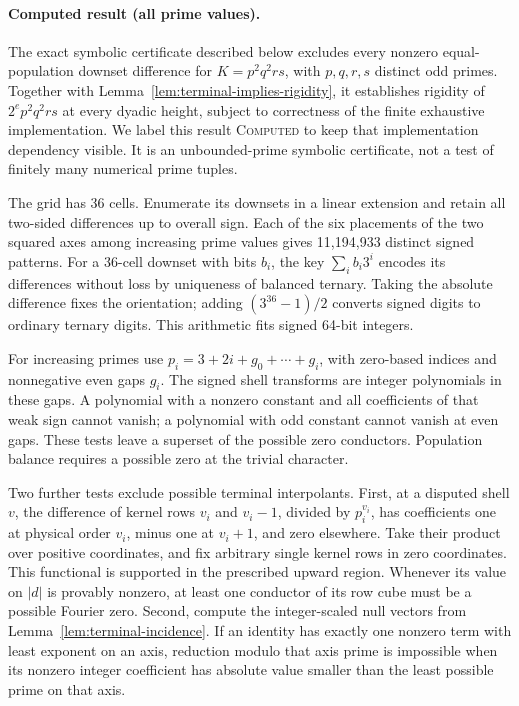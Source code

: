 \paragraph{Computed result (all prime values).}
The exact symbolic certificate described below excludes every nonzero
equal-population downset difference for \(K=p^2q^2rs\), with
\(p,q,r,s\) distinct odd primes. Together with
Lemma~\ref{lem:terminal-implies-rigidity}, it establishes rigidity of
\(2^ep^2q^2rs\) at every dyadic height, subject to correctness of the
finite exhaustive implementation. We label this result \textsc{Computed}
to keep that implementation dependency visible. It is an unbounded-prime
symbolic certificate, not a test of finitely many numerical prime tuples.

The grid has 36 cells. Enumerate its downsets in a linear extension and
retain all two-sided differences up to overall sign. Each of the six
placements of the two squared axes among increasing prime values gives
11,194,933 distinct signed patterns. For a 36-cell downset with bits
\(b_i\), the key \(\sum_i b_i3^i\) encodes its differences without
loss by uniqueness of balanced ternary. Taking the absolute difference
fixes the orientation; adding \((3^{36}-1)/2\) converts signed digits
to ordinary ternary digits. This arithmetic fits signed 64-bit integers.

For increasing primes use
\(p_i=3+2i+g_0+\cdots+g_i\), with zero-based indices and
nonnegative even gaps \(g_i\). The signed shell transforms are integer
polynomials in these gaps. A polynomial with a nonzero constant and all
coefficients of that weak sign cannot vanish; a polynomial with odd
constant cannot vanish at even gaps. These tests leave a superset of
the possible zero conductors. Population balance requires a possible
zero at the trivial character.

Two further tests exclude possible terminal interpolants. First, at a
disputed shell \(v\), the difference of kernel rows \(v_i\) and
\(v_i-1\), divided by \(p_i^{v_i}\), has coefficients one at
physical order \(v_i\), minus one at \(v_i+1\), and zero elsewhere.
Take their product over positive coordinates, and fix arbitrary single
kernel rows in zero coordinates. This functional is supported in the
prescribed upward region. Whenever its value on \(|d|\) is provably
nonzero, at least one conductor of its row cube must be a possible
Fourier zero. Second, compute the integer-scaled null vectors from
Lemma~\ref{lem:terminal-incidence}. If an identity has exactly one
nonzero term with least exponent on an axis, reduction modulo that
axis prime is impossible when its nonzero integer coefficient has
absolute value smaller than the least possible prime on that axis.

